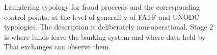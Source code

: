 \begin{figure}[!htbp]
\caption{Laundering typology for fraud proceeds and the corresponding control points, at the level of generality of
FATF and UNODC typologies. The description is deliberately non-operational. Stage 2 is where funds leave the banking
system and where data held by Thai exchanges can observe them.}
\label{fig:typology}
\end{figure}
